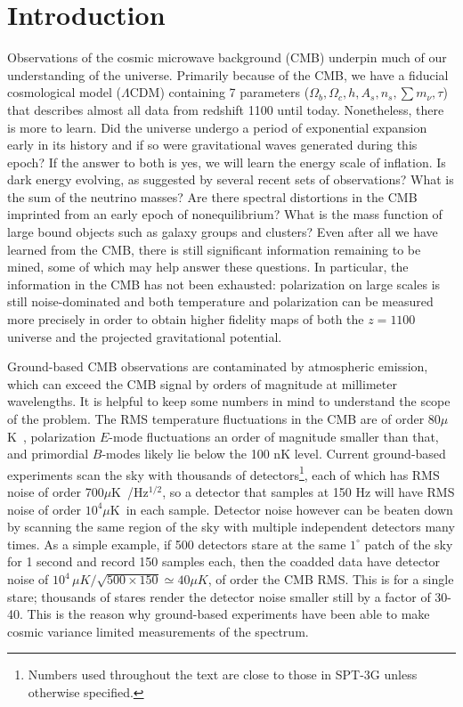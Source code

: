 \newcommand\muk{$\mu$K\, }


\section{Introduction}

Observations of the cosmic microwave background (CMB) underpin much of our understanding of the universe. Primarily because of the CMB, we have a fiducial cosmological model ($\Lambda$CDM) containing  7 parameters ($\Omega_b, \Omega_c, h, A_s, n_s, \sum m_\nu, \tau$)  that describes almost all data from redshift 1100 until today. Nonetheless, there is more to learn. Did the universe undergo a period of exponential expansion early in its history and if so were gravitational waves generated during this epoch? If the answer to both is yes, we will learn the energy scale of inflation. Is dark energy evolving, as suggested by several recent sets of observations? What is the sum of the neutrino masses? Are there spectral distortions in the CMB imprinted from an early epoch of nonequilibrium? What is the mass function of large bound objects such as galaxy groups and clusters? Even after all we have learned from the CMB, there is still significant information remaining to be mined, some of which may help answer these questions. In particular, the information in the CMB has not been exhausted: polarization on large scales is still noise-dominated and both temperature and polarization can be measured more precisely in order to obtain higher fidelity maps of both the $z=1100$ universe and the projected gravitational potential. 

Ground-based CMB observations are contaminated by atmospheric emission, which can exceed the CMB signal by orders of magnitude at millimeter wavelengths. It is helpful to keep some numbers in mind to understand the scope of the problem. The RMS temperature fluctuations in the CMB are of order 80\muk, polarization $E$-mode fluctuations an order of magnitude smaller than that, and primordial $B$-modes likely lie below the 100 nK level. Current ground-based experiments scan the sky with thousands of detectors\footnote{Numbers used throughout the text are close to those in SPT-3G unless otherwise specified.}, each of which has RMS noise of order 700\muk/Hz$^{1/2}$, so a detector that samples at 150 Hz will have RMS noise of order $10^4$\muk in each sample. Detector noise however can be beaten down by scanning the same region of the sky with multiple independent detectors many times. As a simple example, if 500 detectors stare at the same $1^\circ$ patch of the sky for 1 second and record 150 samples each, then the coadded data have detector noise of $10^4\,\mu K/\sqrt{500\times 150} \simeq 40\mu K$, of order the CMB RMS. This is for a single stare; thousands of stares render the detector noise smaller still by a factor of 30-40. This is the reason why ground-based experiments have been able to make cosmic variance limited measurements of the spectrum. 


